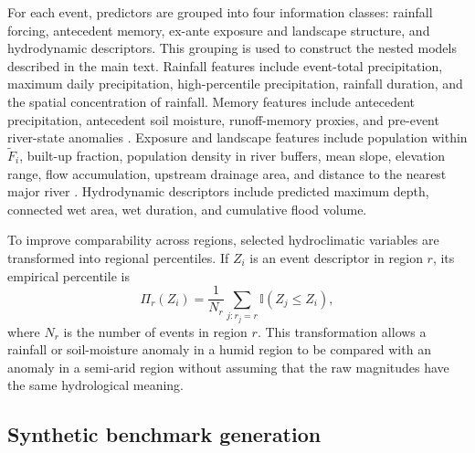 \documentclass[pdflatex,sn-mathphys-ay]{sn-jnl}
\theoremstyle{thmstyleone}
\begin{document}
\begin{appendices}
For each event, predictors are grouped into four information classes:
rainfall forcing, antecedent memory, ex-ante exposure and landscape
structure, and hydrodynamic descriptors.  This grouping is used to
construct the nested models described in the main text.  Rainfall
features include event-total precipitation, maximum daily
precipitation, high-percentile precipitation, rainfall duration, and
the spatial concentration of rainfall.  Memory features include
antecedent precipitation, antecedent soil moisture, runoff-memory
proxies, and pre-event river-state anomalies
\citep{Seneviratne2010,Stephens2015}.  Exposure and landscape
features include population within $\widetilde{F}_i$, built-up
fraction, population density in river buffers, mean slope, elevation
range, flow accumulation, upstream drainage area, and distance to the
nearest major river \citep{Tellman2021,Rentschler2022}.  Hydrodynamic descriptors include predicted
maximum depth, connected wet area, wet duration, and cumulative flood
volume.

To improve comparability across regions, selected hydroclimatic
variables are transformed into regional percentiles.  If $Z_i$ is an
event descriptor in region $r$, its empirical percentile is
\begin{equation}
  \Pi_r(Z_i)
  =
  \frac{1}{N_r}
  \sum_{j:r_j=r}
  \mathbb{I}
  \left(
    Z_j\leq Z_i
  \right),
  \label{eq:app_percentile}
\end{equation}
where $N_r$ is the number of events in region $r$.  This transformation
allows a rainfall or soil-moisture anomaly in a humid region to be
compared with an anomaly in a semi-arid region without assuming that
the raw magnitudes have the same hydrological meaning.

\subsection{Synthetic benchmark generation}
\label{app:synthetic_generation}


\end{appendices}
\end{document}
